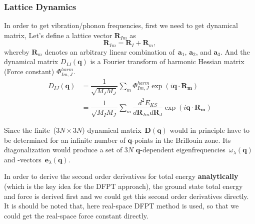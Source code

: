 \subsubsection{Lattice Dynamics}
In order to get vibration/phonon frequencies, first we need to get dynamical matrix, 
Let's define a lattice vector $\mathbf{R}_{Im}$ as 
\begin{equation}
\mathbf{R}_{Im} = \mathbf{R}_I+\mathbf{R}_m,
\label{PeriodicImage}
\end{equation}
whereby $\mathbf{R}_m$ denotes an arbitrary linear combination of~$\mathbf{a}_1$, $\mathbf{a}_2$, and $\mathbf{a}_3$. 
And the dynamical matrix $D_{IJ}(\mathbf{q})$ is a Fourier transform of harmonic Hessian matrix (Force constant) $\Phi_{Im,J}^{harm}$. 
\begin{align}
D_{IJ}(\mathbf{q}) &=\dfrac{1}{\sqrt{M_I M_J}} \sum_{m} \Phi_{Im,J}^{harm} \exp{\left(i\mathbf{q}\cdot\mathbf{R_m}\right)}  \nonumber \\
&=\dfrac{1}{\sqrt{M_I M_J}} \sum_{m}\dfrac{d^2 E_{KS}}{d \mathbf{R}_{Im} d \mathbf{R}_{J}  }\exp{\left(i\mathbf{q}\cdot\mathbf{R_m}\right)} 
\label{dynmat_FT}
\end{align}

Since the finite~($3N\times 3N$) dynamical matrix~$\mathbf{D}(\mathbf{q})$ would in principle have to be determined for an infinite number of $\mathbf{q}$-points in the Brillouin zone.  Its diagonalization would produce a set of $3N$ $\mathbf{q}$-dependent eigenfrequencies~$\omega_\lambda(\mathbf{q})$ and -vectors~$\mathbf{e}_\lambda(\mathbf{q})$. 

In order to derive the second order derivatives for
total energy \textbf{analytically} (which is the key idea for the DFPT approach), the ground state total energy and force is derived first and we could get this second order derivatives directly. It is should be 
noted that, here real-space DFPT method is used,
so that we could get the real-space force constant
directly. 



